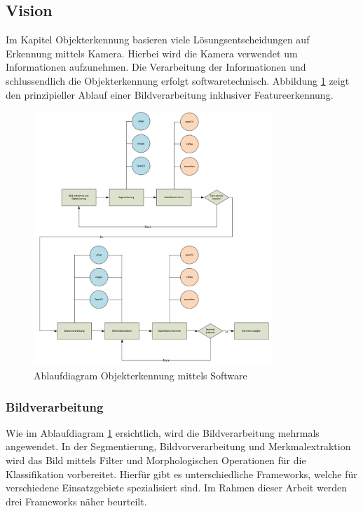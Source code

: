 \documentclass[../../../main.tex]{subfiles}
\begin{document}
    \subsection{Vision}
    Im Kapitel Objekterkennung basieren viele Lösungsentscheidungen auf Erkennung mittels Kamera. Hierbei wird die Kamera verwendet um Informationen aufzunehmen. Die Verarbeitung der Informationen und schlussendlich die Objekterkennung erfolgt softwaretechnisch. Abbildung \ref{fig:vision_ablauf} zeigt den prinzipieller Ablauf einer Bildverarbeitung inklusiver Featureerkennung.\\
    \begin{figure}[H] %
        \centering
        \includegraphics[width=0.8\textwidth]{Ablauf_vision.png}
        \caption{Ablaufdiagram Objekterkennung mittels Software}
        \label{fig:vision_ablauf}
    \end{figure}

    \subsubsection{Bildverarbeitung}
        Wie im Ablaufdiagram \ref{fig:vision_ablauf} ersichtlich, wird die Bildverarbeitung mehrmals angewendet. In der Segmentierung, Bildvorverarbeitung und Merkmalextraktion wird das Bild mittels Filter und Morphologischen Operationen für die Klassifikation vorbereitet. Hierfür gibt es unterschiedliche Frameworks, welche für verschiedene Einsatzgebiete spezialisiert sind. Im Rahmen dieser Arbeit werden drei Frameworks näher beurteilt.\\
        \pagebreak
\end{document}
